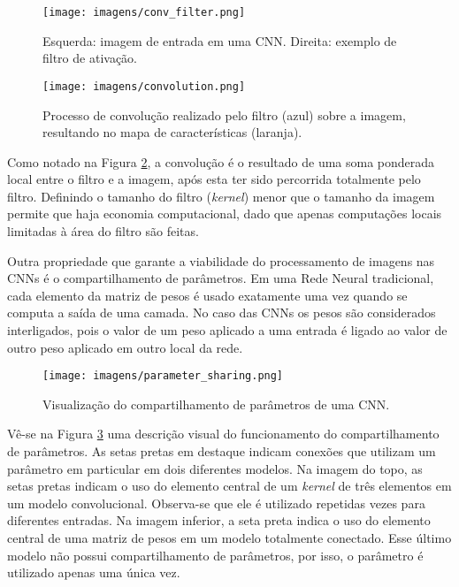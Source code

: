 \documentclass[
12pt,       %
openright,      %
oneside,      %
a4paper,      %
english,      %
french,       %
spanish,      %
brazil        %
]{abntex2}
\begin{document}
\begin{figure}[ht]
\centering
\caption{Esquerda: imagem de entrada em uma CNN. Direita: exemplo de filtro de ativação.}
\texttt{[image: imagens/conv\_filter.png]}
\label{fig:conv_filter}
\end{figure}

\begin{figure}[ht]
\centering
\caption{Processo de convolução realizado pelo filtro (azul) sobre a imagem, resultando no mapa de características (laranja).}
\texttt{[image: imagens/convolution.png]}
\label{fig:convolution}
\end{figure}

Como notado na Figura \ref{fig:convolution}, a convolução é o resultado de uma soma ponderada local entre o filtro e a imagem, após esta ter sido percorrida totalmente pelo filtro. Definindo o tamanho do filtro (\textit{kernel}) menor que o tamanho da imagem permite que haja economia computacional, dado que apenas computações locais limitadas à área do filtro são feitas.

Outra propriedade que garante a viabilidade do processamento de imagens nas CNNs é o compartilhamento de parâmetros. Em uma Rede Neural tradicional, cada elemento da matriz de pesos é usado exatamente uma vez quando se computa a saída de uma camada. No caso das CNNs os pesos são considerados interligados, pois o valor de um peso aplicado a uma entrada é ligado ao valor de outro peso aplicado em outro local da rede.

\begin{figure}[ht]
\centering
\caption{Visualização do compartilhamento de parâmetros de uma CNN.}
\texttt{[image: imagens/parameter\_sharing.png]}
\label{fig:paramater_sharing}
\end{figure}

Vê-se na Figura \ref{fig:paramater_sharing} uma descrição visual do funcionamento do compartilhamento de parâmetros. As setas pretas em destaque indicam conexões que utilizam um parâmetro em particular em dois diferentes modelos. Na imagem do topo, as setas pretas indicam o uso do elemento central de um \textit{kernel} de três elementos em um modelo convolucional. Observa-se que ele é utilizado repetidas vezes para diferentes entradas. Na imagem inferior, a seta preta indica o uso do elemento central de uma matriz de pesos em um modelo totalmente conectado. Esse último modelo não possui compartilhamento de parâmetros, por isso, o parâmetro é utilizado apenas uma única vez.
\end{document}
